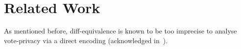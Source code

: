 


\section{Related Work}
\label{sec:back:stateArt}


As mentioned before, diff-equivalence is known to be too 
imprecise to analyse vote-privacy via a direct encoding
(acknowledged \eg in~\cite{DKR-jcs09,vote-CSF16,vote-ifip,vote-CSF08-maffei}).

